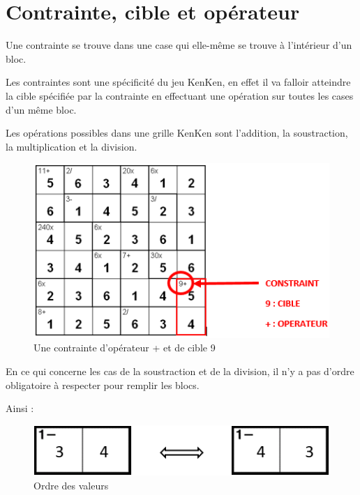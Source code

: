 \documentclass[1]{report}
\begin{document}
    \section{Contrainte, cible et opérateur}
    
  
    
    Une contrainte se trouve dans une case qui elle-même se trouve à l’intérieur d’un bloc. \newline

    Les contraintes sont une spécificité du jeu KenKen, en effet il va falloir atteindre la cible spécifiée par la contrainte en effectuant une opération sur toutes les cases d'un même bloc.
    
    Les opérations possibles dans une grille KenKen sont l’addition, la soustraction, la multiplication et la division.
    

      \begin{figure}[H]
    \centering
        \includegraphics[scale=0.9]{constraint.PNG}
        \caption{Une contrainte d'opérateur + et de cible 9}
    \end{figure}
     
    
    En ce qui concerne les cas de la soustraction et de la division, il n’y a pas d'ordre obligatoire à respecter pour remplir les blocs. \newline
    
    Ainsi :

    \begin{figure}[h]
    \centering
        \includegraphics[scale=0.9]{ordre_contrainte.PNG}
        \caption{Ordre des valeurs}
    \end{figure}
    
\end{document}
